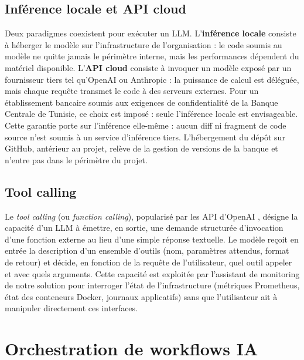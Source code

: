     \subsection{Inférence locale et API cloud}

        Deux paradigmes coexistent pour exécuter un LLM. L'\textbf{inférence locale}
        consiste à héberger le modèle sur l'infrastructure de l'organisation : le code
        soumis au modèle ne quitte jamais le périmètre interne, mais les performances
        dépendent du matériel disponible. L'\textbf{API cloud} consiste à invoquer un
        modèle exposé par un fournisseur tiers tel qu'OpenAI \cite{OpenAI} ou
        Anthropic \cite{Anthropic} : la puissance
        de calcul est déléguée, mais chaque requête transmet le code à des serveurs
        externes. Pour un établissement bancaire soumis aux exigences de confidentialité
        de la Banque Centrale de Tunisie, ce choix est imposé : seule l'inférence
        locale est envisageable. Cette garantie porte sur l'inférence elle-même : aucun
        diff ni fragment de code source n'est soumis à un service d'inférence tiers.
        L'hébergement du dépôt sur GitHub, antérieur au projet, relève de la gestion de
        versions de la banque et n'entre pas dans le périmètre du projet.

    \subsection{Tool calling}

        Le \textit{tool calling} (ou \textit{function calling}), popularisé par les API
        d'OpenAI \cite{OpenAI}, désigne la capacité d'un
        LLM à émettre, en sortie, une demande structurée d'invocation d'une fonction
        externe au lieu d'une simple réponse textuelle. Le modèle reçoit en entrée la
        description d'un ensemble d'outils (nom, paramètres attendus, format de retour)
        et décide, en fonction de la requête de l'utilisateur, quel outil appeler et
        avec quels arguments. Cette capacité est exploitée par l'assistant de monitoring
        de notre solution pour interroger l'état de l'infrastructure (métriques
        Prometheus, état des conteneurs Docker, journaux applicatifs) sans que
        l'utilisateur ait à manipuler directement ces interfaces.

\section{Orchestration de workflows IA}


